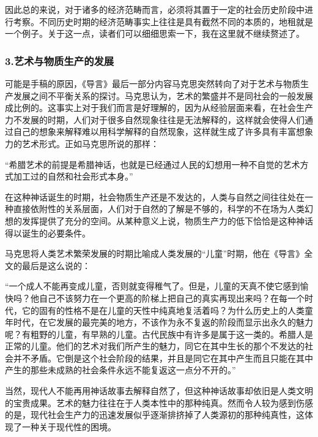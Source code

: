 \documentclass[a4paper,twoside,12pt,AutoFakeBold]{ctexart}
\begin{document}
因此总的来说，对于诸多的经济范畴而言，必须将其置于一定的社会历史阶段中进行考察。不同历史时期的经济范畴事实上往往是具有截然不同的本质的，地租就是一个例子。关于这一点，读者们可以细细思索一下，我在这里就不继续赘述了。

\subsubsection{3.艺术与物质生产的发展}

可能是手稿的原因，《导言》最后一部分内容马克思突然转向了对于艺术与物质生产发展之间不平衡关系的探讨。马克思认为，艺术的繁盛并不是同社会的一般发展成比例的。这事实上对于我们而言是好理解的，因为从经验层面来看，在社会生产力不发展的时期，人们对于很多自然现象往往是无法解释的，这样就会使得人们通过自己的想象来解释难以用科学解释的自然现象，这样就生成了许多具有丰富想象力的艺术形式。正如马克思所说的那样：
\begin{adjustwidth}{2em}{2em}
    \qquad\fangsong
    “希腊艺术的前提是希腊神话，也就是已经通过人民的幻想用一种不自觉的艺术方式加工过的自然和社会形式本身。”
\end{adjustwidth}

在这种神话诞生的时期，社会物质生产还是不发达的，人类与自然之间往往处在一种直接依附性的关系层面，人们对于自然的了解是不够的，科学的不在场为人类幻想的发挥提供了充分的空间。从某种意义上说，物质生产力的低下恰恰是这种神话得以诞生的必要条件。

马克思将人类艺术繁荣发展的时期比喻成人类发展的“儿童”时期，他在《导言》全文的最后是这么说的：
\begin{adjustwidth}{2em}{2em}
    \qquad\fangsong
    “一个成人不能再变成儿童，否则就变得稚气了。但是，儿童的天真不使它感到愉快吗？他自己不该努力在一个更高的阶梯上把自己的真实再现出来吗？在每一个时代，它的固有的性格不是在儿童的天性中纯真地复活着吗？为什么历史上的人类童年时代，在它发展的最完美的地方，不该作为永不复返的阶段而显示出永久的魅力呢？有粗野的儿童，有早熟的儿童。古代民族中有许多是属于这一类的。希腊人是正常的儿童。他们的艺术对我们所产生的魅力，同它在其中生长的那个不发达的社会并不矛盾。它倒是这个社会阶段的结果，并且是同它在其中产生而且只能在其中产生的那些未成熟的社会条件永远不能复返这一点分不开的。”
\end{adjustwidth}

当然，现代人不能再用神话故事去解释自然了，但这种神话故事却依旧是人类文明的宝贵成果。艺术的魅力往往在于人类本性中的那种纯真。然而令人较为感到伤感的是，现代社会生产力的迅速发展似乎逐渐排挤掉了人类源初的那种纯真性，这体现了一种关于现代性的困境。
\end{document}
